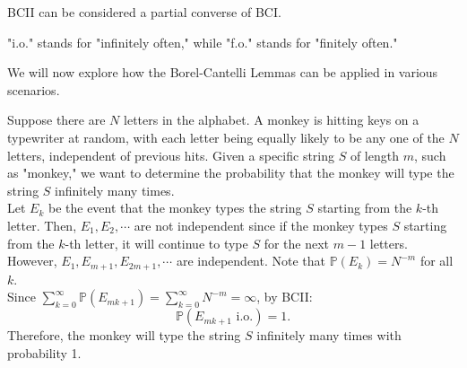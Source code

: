 \documentclass{huhtakm-template-book-v2}
\newcommand{\prob}{\mathbb{P}}
\begin{document}
    \begin{rem}
        BCII can be considered a partial converse of BCI.
    \end{rem}
    \begin{rem}
        "i.o." stands for "infinitely often," while "f.o." stands for "finitely often."
    \end{rem}
    We will now explore how the Borel-Cantelli Lemmas can be applied in various scenarios.
    \begin{eg}
        Suppose there are $N$ letters in the alphabet. A monkey is hitting keys on a typewriter at random, with each letter being equally likely to be any one of the $N$ letters, independent of previous hits. Given a specific string $S$ of length $m$, such as "monkey," we want to determine the probability that the monkey will type the string $S$ infinitely many times.\\
        Let $E_{k}$ be the event that the monkey types the string $S$ starting from the $k$-th letter. Then, $E_{1},E_{2},\cdots$ are not independent since if the monkey types $S$ starting from the $k$-th letter, it will continue to type $S$ for the next $m-1$ letters. However, $E_{1},E_{m+1},E_{2m+1},\cdots$ are independent. Note that $\prob(E_{k}) = N^{-m}$ for all $k$.\\
        Since $\sum_{k = 0}^{\infty}\prob(E_{mk+1}) = \sum_{k = 0}^{\infty}N^{-m} = \infty$, by BCII:
        \begin{equation*}
            \prob(E_{mk+1}\text{ i.o.}) = 1.
        \end{equation*}
        Therefore, the monkey will type the string $S$ infinitely many times with probability 1.
    \end{eg}
    \newpage
\end{document}
